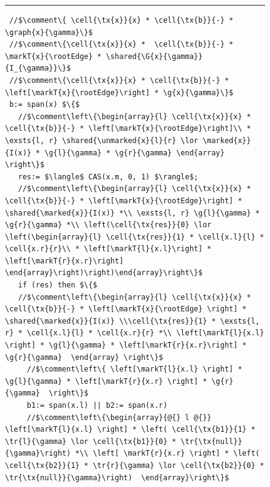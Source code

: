 \begin{figure}
\hrule
\begin{lstlisting}
 //$\comment\{ \cell{\tx{x}}{x} * \cell{\tx{b}}{-} * \graph{x}{\gamma}\}$
 //$\comment\{\cell{\tx{x}}{x} *  \cell{\tx{b}}{-} * \markT{x}{\rootEdge} * \shared{\G{x}{\gamma}}{I_{\gamma}}\}$
 //$\comment\{\cell{\tx{x}}{x} * \cell{\tx{b}}{-} * \left[\markT{x}{\rootEdge}\right] * \g{x}{\gamma}\}$
 b:= span(x) $\{$
   //$\comment\left\{\begin{array}{l} \cell{\tx{x}}{x} * \cell{\tx{b}}{-} * \left[\markT{x}{\rootEdge}\right]\\ * \exsts{l, r} \shared{\unmarked{x}{l}{r} \lor \marked{x}}{I(x)} * \g{l}{\gamma} * \g{r}{\gamma} \end{array} \right\}$
   res:= $\langle$ CAS(x.m, 0, 1) $\rangle$;
   //$\comment\left\{\begin{array}{l} \cell{\tx{x}}{x} * \cell{\tx{b}}{-} * \left[\markT{x}{\rootEdge}\right] * \shared{\marked{x}}{I(x)} *\\ \exsts{l, r} \g{l}{\gamma} * \g{r}{\gamma} *\\ \left(\cell{\tx{res}}{0} \lor  \left(\begin{array}{l} \cell{\tx{res}}{1} * \cell{x.l}{l} * \cell{x.r}{r}\\ * \left[\markT{l}{x.l}\right] * \left[\markT{r}{x.r}\right] \end{array}\right)\right)\end{array}\right\}$
   if (res) then $\{$ 
   //$\comment\left\{\begin{array}{l} \cell{\tx{x}}{x} * \cell{\tx{b}}{-} * \left[\markT{x}{\rootEdge} \right] * \shared{\marked{x}}{I(x)} \\\cell{\tx{res}}{1} * \exsts{l, r} * \cell{x.l}{l} * \cell{x.r}{r} *\\ \left[\markT{l}{x.l} \right] * \g{l}{\gamma} * \left[\markT{r}{x.r}\right] * \g{r}{\gamma}  \end{array} \right\}$
     //$\comment\left\{ \left[\markT{l}{x.l} \right] * \g{l}{\gamma} * \left[\markT{r}{x.r} \right] * \g{r}{\gamma}  \right\}$   
     b1:= span(x.l) || b2:= span(x.r)
     //$\comment\left\{\begin{array}{@{} l @{}}  \left[\markT{l}{x.l} \right] * \left( \cell{\tx{b1}}{1} *  \tr{l}{\gamma} \lor \cell{\tx{b1}}{0} * \tr{\tx{null}}{\gamma}\right) *\\ \left[ \markT{r}{x.r} \right] * \left( \cell{\tx{b2}}{1} * \tr{r}{\gamma} \lor \cell{\tx{b2}}{0} * \tr{\tx{null}}{\gamma}\right)  \end{array}\right\}$   

\end{lstlisting}
\end{figure}
